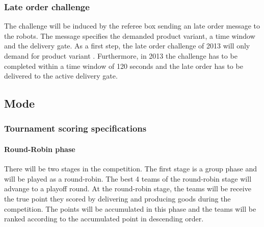 \documentclass[12pt,twoside]{article}
\newcommand{\mytable}[1]{\savebox{\myt}{#1}\tikz\node[fill=gray!25!white]{\usebox{\myt}};}
\begin{document}

\subsubsection{Late order challenge}

The challenge will be induced by the referee box sending an late order
message to the robots. The message specifies the demanded product
variant, a time window and the delivery gate. As a first step, the late
order challenge of 2013 will only demand for product variant
. Furthermore, in 2013 the challenge has to be completed within a
time window of 120 seconds and the late order has to be delivered to
the active delivery gate. 

\subsection{Mode}
\subsubsection{Tournament scoring specifications}


\paragraph{Round-Robin phase} 
There will be two stages in the competition. The first stage is a
group phase and will be played as a round-robin. The best 4 teams of
the round-robin stage will advange to a playoff round.
%
At the round-robin stage, the teams will be receive the true point
they scored by delivering and producing goods during the
competition. The points will be accumulated in this phase and the
teams will be ranked according to the accumulated point in descending
order.
\end{document}
